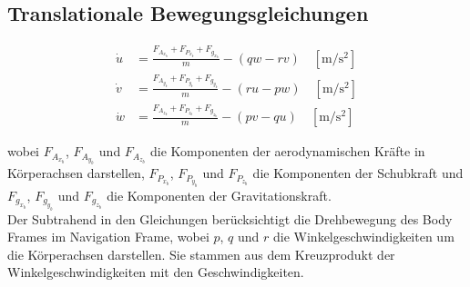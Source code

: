 \subsection{Translationale Bewegungsgleichungen}
\label{subsec:translationale_bewegungsgleichungen}
\begin{align}
\dot{u} &= \frac{F_{A_{x_b}} + F_{P_{x_b}} + F_{g_{x_b}}}{m} - (q w - r v) \quad [\mathrm{m/s^2}] \\[6pt]
\dot{v} &= \frac{F_{A_{y_b}} + F_{P_{y_b}} + F_{g_{y_b}}}{m} - (r u - p w) \quad [\mathrm{m/s^2}] \\[6pt]
\dot{w} &= \frac{F_{A_{z_b}} + F_{P_{z_b}} + F_{g_{z_b}}}{m} - (p v - q u) \quad [\mathrm{m/s^2}]
\end{align}

wobei $F_{A_{x_b}}$, $F_{A_{y_b}}$ und $F_{A_{z_b}}$ die Komponenten der aerodynamischen Kräfte in Körperachsen darstellen, $F_{P_{x_b}}$, $F_{P_{y_b}}$ und $F_{P_{z_b}}$ die Komponenten der Schubkraft und $F_{g_{x_b}}$, $F_{g_{y_b}}$ und $F_{g_{z_b}}$ die Komponenten der Gravitationskraft.
\\
Der Subtrahend in den Gleichungen berücksichtigt die Drehbewegung des Body Frames im Navigation Frame, wobei $p$, $q$ und $r$ die Winkelgeschwindigkeiten um die Körperachsen darstellen.
Sie stammen aus dem Kreuzprodukt der Winkelgeschwindigkeiten mit den Geschwindigkeiten.


